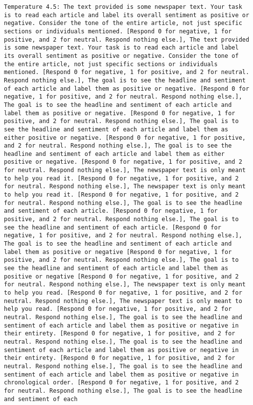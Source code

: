 \begin{lstlisting}[label=lst:poor_performing_prompts]
	Temperature 4.5: The text provided is some newspaper text. Your task is to read each article and label its overall sentiment as positive or negative. Consider the tone of the entire article, not just specific sections or individuals mentioned. [Respond 0 for negative, 1 for positive, and 2 for neutral. Respond nothing else.], The text provided is some newspaper text. Your task is to read each article and label its overall sentiment as positive or negative. Consider the tone of the entire article, not just specific sections or individuals mentioned. [Respond 0 for negative, 1 for positive, and 2 for neutral. Respond nothing else.], The goal is to see the headline and sentiment of each article and label them as positive or negative. [Respond 0 for negative, 1 for positive, and 2 for neutral. Respond nothing else.], The goal is to see the headline and sentiment of each article and label them as positive or negative. [Respond 0 for negative, 1 for positive, and 2 for neutral. Respond nothing else.], The goal is to see the headline and sentiment of each article and label them as either positive or negative. [Respond 0 for negative, 1 for positive, and 2 for neutral. Respond nothing else.], The goal is to see the headline and sentiment of each article and label them as either positive or negative. [Respond 0 for negative, 1 for positive, and 2 for neutral. Respond nothing else.], The newspaper text is only meant to help you read it. [Respond 0 for negative, 1 for positive, and 2 for neutral. Respond nothing else.], The newspaper text is only meant to help you read it. [Respond 0 for negative, 1 for positive, and 2 for neutral. Respond nothing else.], The goal is to see the headline and sentiment of each article. [Respond 0 for negative, 1 for positive, and 2 for neutral. Respond nothing else.], The goal is to see the headline and sentiment of each article. [Respond 0 for negative, 1 for positive, and 2 for neutral. Respond nothing else.], The goal is to see the headline and sentiment of each article and label them as positive or negative [Respond 0 for negative, 1 for positive, and 2 for neutral. Respond nothing else.], The goal is to see the headline and sentiment of each article and label them as positive or negative [Respond 0 for negative, 1 for positive, and 2 for neutral. Respond nothing else.], The newspaper text is only meant to help you read. [Respond 0 for negative, 1 for positive, and 2 for neutral. Respond nothing else.], The newspaper text is only meant to help you read. [Respond 0 for negative, 1 for positive, and 2 for neutral. Respond nothing else.], The goal is to see the headline and sentiment of each article and label them as positive or negative in their entirety. [Respond 0 for negative, 1 for positive, and 2 for neutral. Respond nothing else.], The goal is to see the headline and sentiment of each article and label them as positive or negative in their entirety. [Respond 0 for negative, 1 for positive, and 2 for neutral. Respond nothing else.], The goal is to see the headline and sentiment of each article and label them as positive or negative in chronological order. [Respond 0 for negative, 1 for positive, and 2 for neutral. Respond nothing else.], The goal is to see the headline and sentiment of each 
\end{lstlisting}

